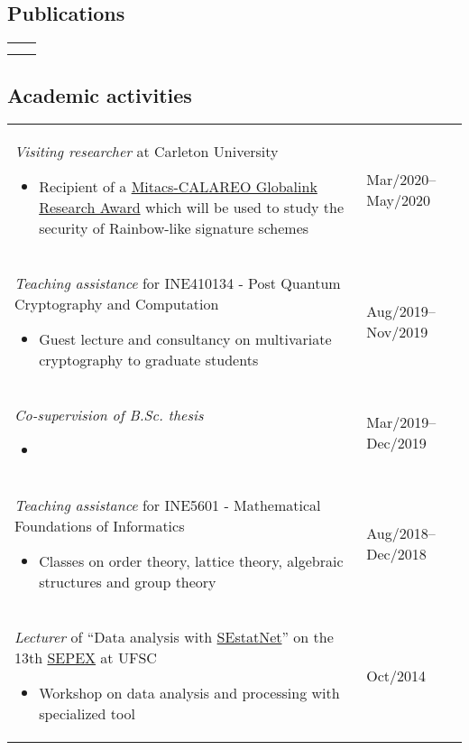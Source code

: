 \documentclass[12pt]{article}
\makeatletter
\newenvironment{datetable}
  {\newcolumntype{R}{>{\raggedleft\arraybackslash}p{0.14\textwidth}}
   \newcolumntype{L}{p{0.84\textwidth}}
   \begin{tabular}{@{\hspace{0mm}}LR}}
  {\end{tabular}}
\newenvironment{contenttable}[1]
  {\subsection*{#1}
   \begin{datetable}}
  {\end{datetable}}
\makeatother
\begin{document}
\begin{contenttable}{Publications}
  \hspace{0mm}
    & \cite{Zambonin:inproc:2019:jul} \vspace{1.25cm} \\

  \hspace{0mm}
    & \cite{Perin:inproc:2018:jun} \\
\end{contenttable}

\begin{contenttable}{Academic activities}
  \textit{Visiting researcher} at Carleton University
  \begin{itemize}
    \item Recipient of a \href{http://archive.is/RHxm4}{Mitacs-CALAREO
        Globalink Research Award} which will be used to study the security of
          Rainbow-like signature schemes
  \end{itemize} & Mar/2020--May/2020 \\

  \textit{Teaching assistance} for INE410134 - Post Quantum Cryptography and
    Computation
  \begin{itemize}
    \item Guest lecture and consultancy on multivariate cryptography to
        graduate students
  \end{itemize} & Aug/2019--Nov/2019 \\

  \textit{Co-supervision of B.Sc. thesis}
  \begin{itemize}
    \item {}
  \end{itemize} & Mar/2019--Dec/2019 \\

  \textit{Teaching assistance} for INE5601 - Mathematical Foundations of
    Informatics
  \begin{itemize}
    \item Classes on order theory, lattice theory, algebraic structures and
        group theory
  \end{itemize} & Aug/2018--Dec/2018 \\

  \textit{Lecturer} of ``Data analysis with
    \href{http://sestatnet.ufsc.br}{SEstatNet}'' on the 13th
    \href{https://sepex.ufsc.br/}{SEPEX} at UFSC
  \begin{itemize}
    \item Workshop on data analysis and processing with specialized tool
  \end{itemize} & Oct/2014 \\


\end{contenttable}
\end{document}
